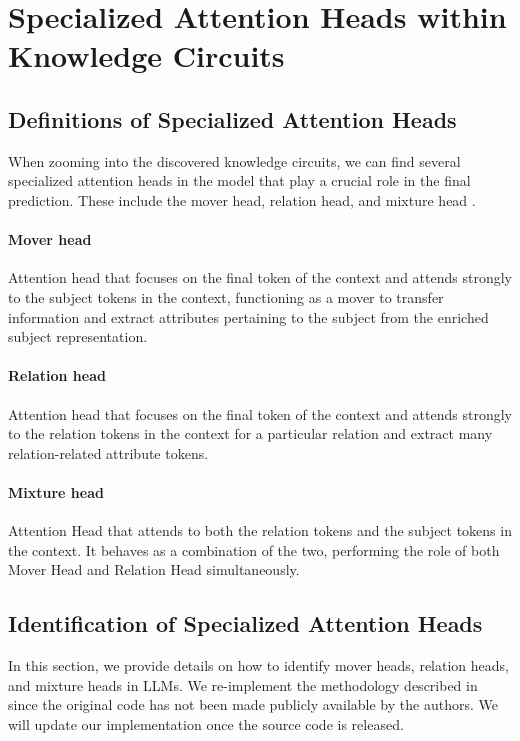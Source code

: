 \section{Specialized Attention Heads within Knowledge Circuits}
\label{app:specialized_components}

\subsection{Definitions of Specialized Attention Heads}

When zooming into the discovered knowledge circuits, we can find several specialized attention heads in the model that play a crucial role in the final prediction.
These include the mover head, relation head, and mixture head \citep{additive_mechanisms}.

\paragraph{Mover head}
Attention head that focuses on the final token of the context and attends strongly to the subject tokens in the context, functioning as a mover to transfer information and extract attributes pertaining to the subject from the enriched subject representation.

\paragraph{Relation head}
Attention head that focuses on the final token of the context and attends strongly to the relation tokens in the context for a particular relation and extract many relation-related attribute tokens.

\paragraph{Mixture head}
Attention Head that attends to both the relation tokens and the subject tokens in the context.
It behaves as a combination of the two, performing the role of both Mover Head and Relation Head simultaneously.

\subsection{Identification of Specialized Attention Heads}
In this section, we provide details on how to identify mover heads, relation heads, and mixture heads in LLMs.
We re-implement the methodology described in \citet{additive_mechanisms} since the original code has not been made publicly available by the authors.
We will update our implementation once the source code is released.

